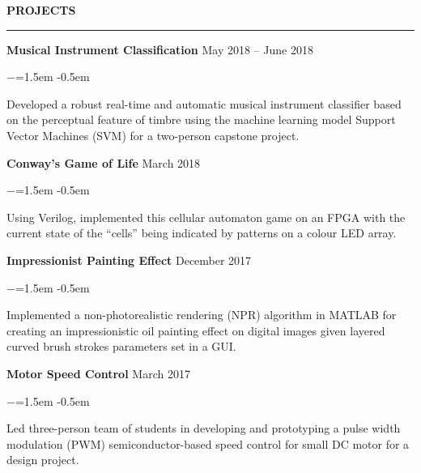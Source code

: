 \documentclass[letterpaper,11pt]{article}
\def\sectionlineskip{\smallskip} %
\def\sectionskip{\smallskip} %
\newenvironment{rSection}[1]{ %
\sectionskip
\MakeUppercase{\bf #1} %
\sectionlineskip
\hrule %
\begin{list}{}{ %
\setlength{\leftmargin}{1.5em} %
}
\item[]
}{\end{list}}
\newenvironment{rSubsection}[6]{ %
{\bf #1} \hfill {#2} \\ %
\ifthenelse{\equal{#3}{}}{}{ %
{#3} \hfill {#4} \\
}
\ifthenelse{\equal{#5}{}}{}{ %
{#5} \hfill {#6} \\
}

\begin{list}{$-$}{\leftmargin=1.5em} %
\itemsep -0.5em \vspace{-0.5em} %
\medskip
}{\end{list}}
\begin{document}
\begin{rSection}{Projects} 

\begin{rSubsection}{Musical Instrument Classification}{May 2018 -- June 2018}{}{}{}{}  

\item Developed a robust real-time and automatic musical instrument classifier based on the perceptual feature of timbre using the machine learning model Support Vector Machines (SVM) for a two-person capstone project.  

\end{rSubsection}


\begin{rSubsection}{Conway's Game of Life}{March 2018}{}{}{}{}  

\item Using Verilog, implemented this cellular automaton game on an FPGA with the current state of the “cells” being indicated by patterns on a colour LED array.  

\end{rSubsection}


\begin{rSubsection}{Impressionist Painting Effect}{December 2017}{}{}{}{} 

\item Implemented a non-photorealistic rendering (NPR) algorithm in MATLAB for creating an impressionistic oil painting effect on digital images given layered curved brush strokes parameters set in a GUI.   

\end{rSubsection}


\begin{rSubsection}{Motor Speed Control}{March 2017}{}{}{}{} 

\item Led three-person team of students in developing and prototyping a pulse width modulation (PWM) semiconductor-based speed control for small DC motor for a design project.

\end{rSubsection} 

\end{rSection} 
\end{document}
